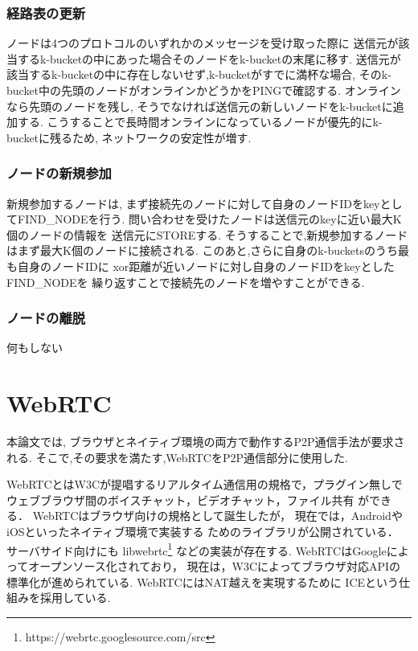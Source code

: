 \documentclass[sotsuron]{jcsie}
\begin{document}
\subsubsection{経路表の更新}
ノードは4つのプロトコルのいずれかのメッセージを受け取った際に
送信元が該当するk-bucketの中にあった場合そのノードをk-bucketの末尾に移す.
送信元が該当するk-bucketの中に存在しないせず,k-bucketがすでに満杯な場合,
そのk-bucket中の先頭のノードがオンラインかどうかをPINGで確認する.
オンラインなら先頭のノードを残し,
そうでなければ送信元の新しいノードをk-bucketに追加する.
こうすることで長時間オンラインになっているノードが優先的にk-bucketに残るため,
ネットワークの安定性が増す.
\subsubsection{ノードの新規参加}
新規参加するノードは,
まず接続先のノードに対して自身のノードIDをkeyとしてFIND\_NODEを行う.
問い合わせを受けたノードは送信元のkeyに近い最大K個のノードの情報を
送信元にSTOREする.
そうすることで,新規参加するノードはまず最大K個のノードに接続される.
このあと,さらに自身のk-bucketsのうち最も自身のノードIDに
xor距離が近いノードに対し自身のノードIDをkeyとしたFIND\_NODEを
繰り返すことで接続先のノードを増やすことができる.
\subsubsection{ノードの離脱}
何もしない

\section{WebRTC}
本論文では,
ブラウザとネイティブ環境の両方で動作するP2P通信手法が要求される.
そこで,その要求を満たす,WebRTCをP2P通信部分に使用した.

WebRTCとはW3Cが提唱するリアルタイム通信用の規格で，プラグイン無しで
ウェブブラウザ間のボイスチャット，ビデオチャット，ファイル共有
ができる．
WebRTCはブラウザ向けの規格として誕生したが，
現在では，AndroidやiOSといったネイティブ環境で実装する
ためのライブラリが公開されている．
サーバサイド向けにも
libwebrtc\footnote{https://webrtc.googlesource.com/src}
などの実装が存在する.
WebRTCはGoogleによってオープンソース化されており，
現在は，W3Cによってブラウザ対応APIの標準化が進められている.
WebRTCにはNAT越えを実現するために
ICE\cite{rosenberg2010interactive}という仕組みを採用している.
\end{document}
